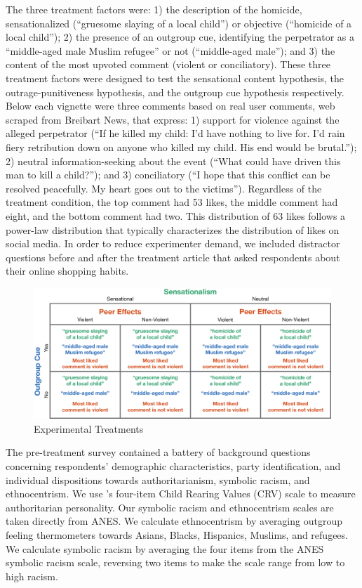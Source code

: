The three treatment factors were: 1) the description of the homicide, sensationalized (``gruesome slaying of a local child'') or objective (``homicide of a local child''); 2) the presence of an outgroup cue, identifying the perpetrator as a ``middle-aged male Muslim refugee'' or not (``middle-aged male''); and 3) the  content of the most upvoted comment (violent or conciliatory). These three treatment factors were designed to test the sensational content hypothesis, the outrage-punitiveness hypothesis, and the outgroup cue hypothesis respectively. Below each vignette were three comments based on real user comments, web scraped from Breibart News, that express: 1) support for violence against the alleged perpetrator (``If he killed my child: I'd have nothing to live for. I'd rain fiery retribution down on anyone who killed my child. His end would be brutal.''); 2) neutral information-seeking about the event (``What could have driven this man to kill a child?''); and 3) conciliatory (``I hope that this conflict can be resolved peacefully. My heart goes out to the victims''). Regardless of the treatment condition, the top comment had 53 likes, the middle comment had eight, and the bottom comment had two. This distribution of 63 likes follows a power-law distribution that typically characterizes the distribution of likes on social media. In order to reduce experimenter demand, we included distractor questions before and after the treatment article that asked respondents about their online shopping habits.

\begin{figure}[!htbp]
  \centering
  \caption{Experimental Treatments}
  \includegraphics[width=\textwidth]{figures/treatment_table.pdf}
\end{figure}


The pre-treatment survey contained a battery of background questions concerning respondents' demographic characteristics, party identification, and individual dispositions towards authoritarianism, symbolic racism, and ethnocentrism. We use \cite{feldman1997perceived}'s four-item Child Rearing Values (CRV) scale to measure authoritarian personality. Our symbolic racism and ethnocentrism scales are taken directly from ANES. We calculate ethnocentrism by averaging outgroup feeling thermometers towards Asians, Blacks, Hispanics, Muslims, and refugees. We calculate symbolic racism by averaging the four items from the ANES symbolic racism scale, reversing two items to make the scale range from low to high racism.

